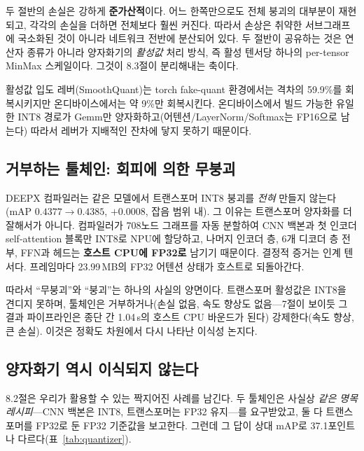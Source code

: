 \documentclass[11pt]{article}
\begin{document}
두 절반의 손실은 강하게 \textbf{준가산적}이다. 어느 한쪽만으로도 전체 붕괴의 대부분이 재현되고, 각각의 손실을 더하면 전체보다 훨씬 커진다. 따라서 손상은 취약한 서브그래프에 국소화된 것이 아니라 네트워크 전반에 분산되어 있다. 두 절반이 공유하는 것은 연산자 종류가 아니라 양자화기의 \emph{활성값} 처리 방식, 즉 활성 텐서당 하나의 per-tensor MinMax 스케일이다. 그것이 8.3절이 분리해내는 축이다.

활성값 입도 레버(SmoothQuant)는 torch fake-quant 환경에서는 격차의 59.9\%를 회복시키지만 온디바이스에서는 약 9\%만 회복시킨다. 온디바이스에서 빌드 가능한 유일한 INT8 경로가 Gemm만 양자화하고(어텐션/LayerNorm/Softmax는 FP16으로 남는다) 따라서 레버가 지배적인 잔차에 닿지 못하기 때문이다.

\subsection{거부하는 툴체인: 회피에 의한 무붕괴}

DEEPX 컴파일러는 같은 모델에서 트랜스포머 INT8 붕괴를 \emph{전혀} 만들지 않는다(mAP $0.4377 \rightarrow 0.4385$, $+0.0008$, 잡음 범위 내). 그 이유는 트랜스포머 양자화를 더 잘해서가 아니다. 컴파일러가 708노드 그래프를 자동 분할하여 CNN 백본과 첫 인코더 self-attention 블록만 INT8로 NPU에 할당하고, 나머지 인코더 층, 6개 디코더 층 전부, FFN과 헤드는 \textbf{호스트 CPU에 FP32로} 남기기 때문이다. 결정적 증거는 인계 텐서다. 프레임마다 23.99\,MB의 FP32 어텐션 상태가 호스트로 되돌아간다.

따라서 ``무붕괴''와 ``붕괴''는 하나의 사실의 양면이다. 트랜스포머 활성값은 INT8을 견디지 못하며, 툴체인은 거부하거나(손실 없음, 속도 향상도 없음---7절이 보이듯 그 결과 파이프라인은 종단 간 1.04\,s의 호스트 CPU 바운드가 된다) 강제한다(속도 향상, 큰 손실). 이것은 정확도 차원에서 다시 나타난 이식성 논지다.

\subsection{양자화기 역시 이식되지 않는다}

8.2절은 우리가 활용할 수 있는 짝지어진 사례를 남긴다. 두 툴체인은 사실상 \emph{같은 명목 레시피}---CNN 백본은 INT8, 트랜스포머는 FP32 유지---를 요구받았고, 둘 다 트랜스포머를 FP32로 둔 FP32 기준값을 보고한다. 그런데 그 답이 상대 mAP로 37.1포인트나 다르다(표~\ref{tab:quantizer}).
\end{document}
